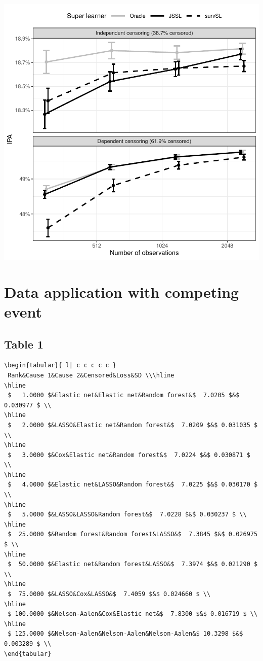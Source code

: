 \documentclass[11pt]{article}
\begin{document}
\begin{center}
\includegraphics[width=.9\linewidth]{experiment-fig-sl-survSL-cens.pdf}
\label{}
\end{center}
\section{Data application with competing event}
\label{sec:orgeafe8e7}
\subsection{Table 1}
\label{sec:org89f8d1b}

\label{}
\begin{verbatim}
\begin{tabular}{ l| c c c c c } 
 Rank&Cause 1&Cause 2&Censored&Loss&SD \\\hline
\hline
 $   1.0000 $&Elastic net&Elastic net&Random forest&$  7.0205 $&$ 0.030977 $ \\
\hline
 $   2.0000 $&LASSO&Elastic net&Random forest&$  7.0209 $&$ 0.031035 $ \\
\hline
 $   3.0000 $&Cox&Elastic net&Random forest&$  7.0224 $&$ 0.030871 $ \\
\hline
 $   4.0000 $&Elastic net&LASSO&Random forest&$  7.0225 $&$ 0.030170 $ \\
\hline
 $   5.0000 $&LASSO&LASSO&Random forest&$  7.0228 $&$ 0.030237 $ \\
\hline
 $  25.0000 $&Random forest&Random forest&LASSO&$  7.3845 $&$ 0.026975 $ \\
\hline
 $  50.0000 $&Elastic net&Random forest&LASSO&$  7.3974 $&$ 0.021290 $ \\
\hline
 $  75.0000 $&LASSO&Cox&LASSO&$  7.4059 $&$ 0.024660 $ \\
\hline
 $ 100.0000 $&Nelson-Aalen&Cox&Elastic net&$  7.8300 $&$ 0.016719 $ \\
\hline
 $ 125.0000 $&Nelson-Aalen&Nelson-Aalen&Nelson-Aalen&$ 10.3298 $&$ 0.003289 $ \\
\end{tabular}
\end{verbatim}
\end{document}
